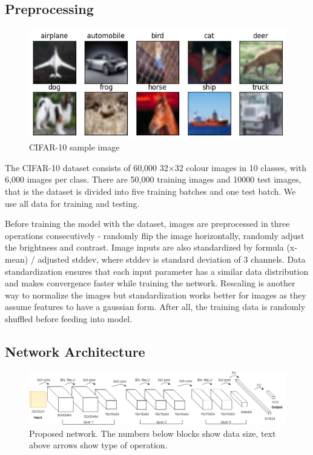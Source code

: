\documentclass[journal,onecolumn]{IEEEtran}
\begin{document}
\subsection{Preprocessing}

\begin{figure}[!t]
\includegraphics[width=0.6\paperwidth]{images/class}
\caption{CIFAR-10 sample image}
\end{figure}

The CIFAR-10 dataset consists of 60,000 32×32 colour images in 10 classes, with 6,000 images per class. There are 50,000 training images and 10000 test images, that is the dataset is divided into five training batches and one test batch. We use all data for training and testing.

Before training the model with the dataset, images are preprocessed in three operations consecutively - randomly flip the image horizontally, randomly adjust the brightness and contrast. Image inputs are also standardized by formula (x-mean) / adjusted stddev, where stddev is standard deviation of 3 channels. Data standardization ensures that each input parameter has a similar data distribution and makes convergence faster while training the network. Rescaling is another way to normalize the images but standardization works better for images as they assume features to have a gaussian form. After all, the training data is randomly shuffled before feeding into model.

\subsection{Network Architecture}

\begin{figure}[!t]
\includegraphics[width=0.8\paperwidth]{images/our_net}
\caption{Proposed network. The numbers below blocks show data size, text above arrows show type of operation.}
\end{figure}
\end{document}
